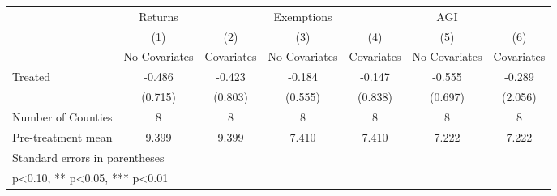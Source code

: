 {
\def\sym#1{\ifmmode^{#1}\else\(^{#1}\)\fi}
\begin{tabular}{l*{6}{c}}
\hline\hline
            &     Returns   &               &  Exemptions   &               &         AGI   &               \\
            &\multicolumn{1}{c}{(1)}&\multicolumn{1}{c}{(2)}&\multicolumn{1}{c}{(3)}&\multicolumn{1}{c}{(4)}&\multicolumn{1}{c}{(5)}&\multicolumn{1}{c}{(6)}\\
            &\multicolumn{1}{c}{No Covariates}&\multicolumn{1}{c}{Covariates}&\multicolumn{1}{c}{No Covariates}&\multicolumn{1}{c}{Covariates}&\multicolumn{1}{c}{No Covariates}&\multicolumn{1}{c}{Covariates}\\
\hline
Treated     &      -0.486   &      -0.423   &      -0.184   &      -0.147   &      -0.555   &      -0.289   \\
            &     (0.715)   &     (0.803)   &     (0.555)   &     (0.838)   &     (0.697)   &     (2.056)   \\
\hline
Number of Counties&           8   &           8   &           8   &           8   &           8   &           8   \\
Pre-treatment mean&       9.399   &       9.399   &       7.410   &       7.410   &       7.222   &       7.222   \\
\hline\hline
\multicolumn{7}{l}{\footnotesize Standard errors in parentheses}\\
\multicolumn{7}{l}{\footnotesize * p<0.10, ** p<0.05, *** p<0.01}\\
\end{tabular}
}
